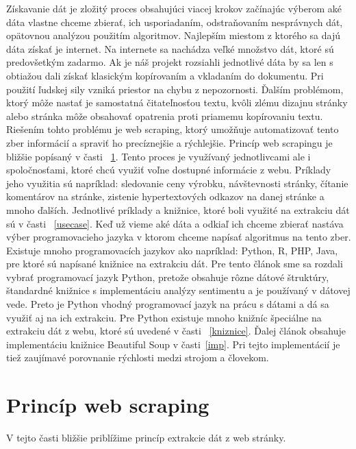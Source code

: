 \documentclass[10pt,twoside,slovak,a4paper]{article}
\begin{document}
Získavanie dát je zložitý proces obsahujúci viacej krokov začínajúc výberom aké dáta vlastne chceme zbierať, ich usporiadaním, odstraňovaním nesprávnych dát, opätovnou analýzou použitím algoritmov\cite{8822022}. Najlepším miestom z ktorého sa dajú dáta získať je internet. Na internete sa nachádza veľké množstvo dát, ktoré sú predovšetkým zadarmo. Ak je náš projekt rozsiahli jednotlivé dáta by sa len s obtiažou dali získať klasickým kopírovaním a vkladaním do dokumentu. Pri použití ľudskej sily vzniká priestor na chybu z nepozornosti\cite{10145369}. Ďalším problémom, ktorý môže nastať je samostatná čitateľnosťou textu, kvôli zlému dizajnu stránky alebo stránka môže obsahovať opatrenia proti priamemu kopírovaniu textu. Riešením tohto problému je web scraping, ktorý umožňuje automatizovať tento zber informácií a spraviť ho precíznejšie a rýchlejšie. Princíp web scrapingu je bližšie popísaný v časti ~\ref{webscraping}. Tento proces je využívaný jednotlivcami ale i spoločnosťami, ktoré chcú využiť voľne dostupné informácie z webu\cite{10145369}. Príklady jeho využitia sú napríklad: sledovanie ceny výrobku, návštevnosti stránky,  čítanie komentárov na stránke, zistenie hypertextových odkazov na danej stránke a mnoho ďalších\cite{10250745}. Jednotlivé príklady a knižnice, ktoré boli využité na extrakciu dát sú v časti ~\ref{usecase}. Keď už vieme aké dáta a odkiaľ ich chceme zbierať nastáva výber programovacieho jazyka v ktorom chceme napísať algoritmus na tento zber. Existuje mnoho programovacích jazykov ako napríklad: Python, R, PHP, Java\cite{ Gheorghe2019ModernTO}, pre ktoré sú napísané knižnice na extrakciu dát. Pre tento článok sme sa rozdali vybrať programovací jazyk Python, pretože obsahuje rôzne dátové štruktúry, štandardné knižnice s implementáciu analýzy sentimentu a je používaný v dátovej vede\cite{8862251}. Preto je Python vhodný programovací jazyk na prácu s dátami a dá sa využiť aj na ich extrakciu. Pre Python existuje mnoho knižníc špeciálne na extrakciu dát z webu, ktoré sú uvedené v časti ~\ref{kniznice}. Ďalej článok obsahuje implementáciu knižnice Beautiful Soup v časti~\ref{imp}. Pri tejto implementácií je tiež zaujímavé porovnanie rýchlosti medzi strojom a človekom.


\section{Princíp web scraping}\label{webscraping}
V tejto časti bližšie priblížime princíp extrakcie dát z web stránky.
\end{document}
